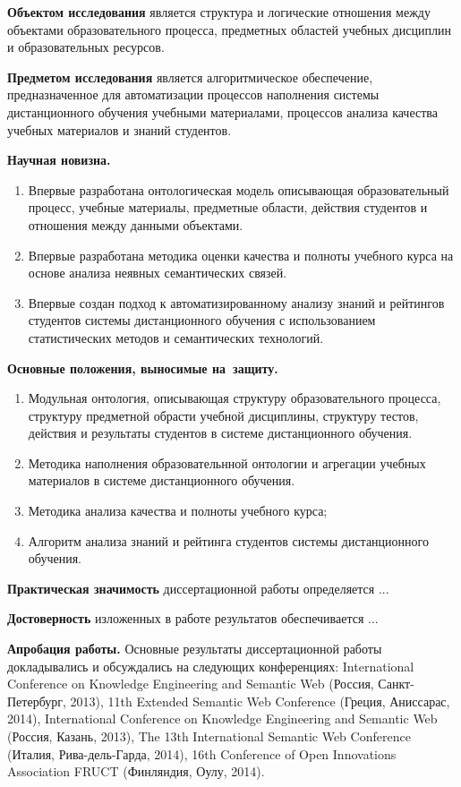 \textbf{Объектом исследования} является структура и логические отношения между объектами образовательного процесса, предметных областей учебных дисциплин и образовательных ресурсов.  

\textbf{Предметом исследования} является алгоритмическое обеспечение, предназначенное для автоматизации процессов наполнения системы дистанционного обучения учебными материалами, процессов анализа качества учебных материалов и знаний студентов. 

\textbf{Научная новизна.}
\begin{enumerate}
 \item Впервые разработана онтологическая модель описывающая образовательный процесс, учебные материалы, предметные области, действия студентов и отношения между данными объектами. 
 \item Впервые разработана методика оценки качества и полноты учебного курса на основе анализа неявных семантических связей.
 \item Впервые создан подход к автоматизированному анализу знаний и рейтингов студентов системы дистанционного обучения с использованием статистических методов и семантических технологий.
\end{enumerate}

\textbf{Основные положения, выносимые на~защиту.}
\begin{enumerate}
 \item Модульная онтология, описывающая структуру образовательного процесса, структуру предметной обрасти учебной дисциплины, структуру тестов, действия и результаты студентов в системе дистанционного обучения.
 \item Методика наполнения образовательнной онтологии и агрегации учебных материалов в системе дистанционного обучения.
 \item Методика анализа качества и полноты учебного курса;
 \item Алгоритм анализа знаний и рейтинга студентов системы дистанционного обучения.
 \end{enumerate}


\textbf{Практическая значимость} диссертационной работы определяется ...

\textbf{Достоверность} изложенных в работе результатов обеспечивается ...



\textbf{Апробация работы.}
Основные результаты диссертационной работы докладывались и обсуждались на следующих конференциях:
International Conference on Knowledge Engineering and Semantic Web (Россия, Санкт-Петербург, 2013),
11th Extended Semantic Web Conference (Греция, Аниссарас, 2014), International Conference on Knowledge Engineering and Semantic Web (Россия, Казань, 2013), The 13th International Semantic Web Conference (Италия, Рива-дель-Гарда, 2014), 16th Conference of Open
Innovations Association FRUCT (Финляндия, Оулу, 2014).

